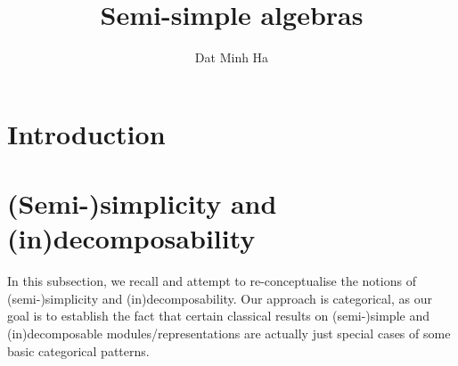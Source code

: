 

\setcounter{section}{-1}





    \title{Semi-simple algebras}
    
    \author{Dat Minh Ha}
    \maketitle
    
    \begin{abstract}
        
    \end{abstract}
    
    {
      \hypersetup{} 
      \tableofcontents %
    }

    \section{Introduction}
    
    \section{(Semi-)simplicity and (in)decomposability}
        In this subsection, we recall and attempt to re-conceptualise the notions of (semi-)simplicity and (in)decomposability. Our approach is categorical, as our goal is to establish the fact that certain classical results on (semi-)simple and (in)decomposable modules/representations are actually just special cases of some basic categorical patterns. 
    
